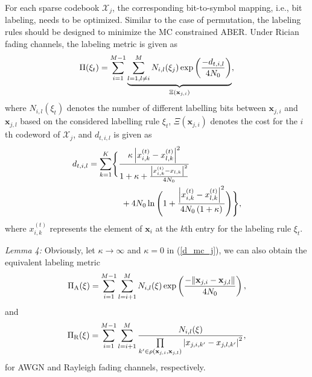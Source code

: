 \documentclass[journal]{IEEEtran}
\begin{document}
For each   sparse codebook  $\boldsymbol{\mathcal X}_{j} $,  the corresponding bit-to-symbol mapping, i.e., bit labeling,   needs to be optimized.   Similar to the case of permutation, the  labeling rules should be  designed to minimize the MC constrained ABER. Under Rician fading channels, the labeling  metric is given as
\begin{equation}
 \small
\label{ricianLabeling}
\Pi (\xi _{t}) =  \sum _{i=1}^{M-1} \underbrace{    \sum _{\substack{l=1,l \neq i}}^{M} N_{i,l}(\xi _{j})\exp \left(\frac{-d_{t,i,l}}{4N_0} \right)}_{\Xi (\mathbf {x}_{j,i})},
\end{equation}
where $N_{i,l}(\xi _{t})$ denotes  the number of different labelling bits between $\mathbf {x}_{j,i} $ and  $\mathbf {x}_{j,l} $ based on the considered labelling rule $\xi _{t}$,  $\Xi (\mathbf {x}_{j,i})$ denotes the cost for the $i$th codeword of $\boldsymbol{\mathcal X}_{j}$, and $d_{t,i,l}$ is given as 
\begin{equation}
 \small
 \label{d_mc_j}
\begin{aligned} 
d_{t,i,l} =\sum \limits _{k=1}^K   &  \Bigg \{{ \frac{ \kappa  \left|    x_{ i,k}^{(t)} -x_{l,k}^{(t)}  \right |^2  }{1+ \kappa +\frac{\left|    x_{i,k}^{(t)} -x_{l,k}   \right |^2 }{4N_0} }    }  \\
  &   \; \; \; \;+  4N_0   \ln \Bigg(1+  \frac{\left|    x_{i,k}^{(t)}-x_{l,k}^{(t)}    \right |^2 }{4N_0 \left( 1+ \kappa\right)}   \Bigg) \Bigg \},
\end{aligned}
  \end{equation}
where  $x_{ i,k}^{(t)}$ represents  the element of $\mathbf {x}_{i} $ at the $k$th entry for the labeling rule $\xi_t$. 

\textit{Lemma 4:}  Obviously,   let   $\kappa \rightarrow \infty$  and 
  $\kappa=0$ in (\ref{d_mc_j}), we can also obtain the equivalent labeling metric  \cite{chen2020design}
 \begin{equation}
 \small
\Pi_{\text{A}} (\xi) = \sum _{i=1}^{M-1} \sum _{l=i+1}^{M} N_{i,l}(\xi )\exp \left(\frac{-\Arrowvert \mathbf {x}_{j,i}-\mathbf {x}_{j,l} \Arrowvert}{4N_0} \right), 
\end{equation} 
and 
\begin{equation}
 \small
\Pi_{\text{R}} (\xi)  =\sum _{i=1}^{M-1} \sum _{l=i+1}^{M} \frac {N_{i,l}(\xi)}{ \prod \limits_{k' \in \rho \left( \mathbf{x}_{j,i}, \mathbf {x}_{j,l}\right)}  \left|x_{j,i,k'}-x_{j,l,k'}\right|^{2}},
\end{equation}
 for AWGN  and  Rayleigh fading channels, respectively.
\end{document}
